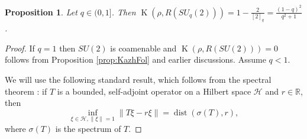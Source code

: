 \documentclass[11 pt, leqno]{amsart}
\newcommand{\eps}{\varepsilon}
\newcommand{\md}{\operatorname{d}\!}
\newcommand{\la}{\langle}
\newcommand{\ra}{\rangle}
\newcommand{\RR}{\mathbb{R}}
\newcommand{\oon}{\operatorname}
\DeclareMathOperator{\Kaz}{K}
\newtheorem{proposition}[theorem]{Proposition}
\theoremstyle{definition}
\numberwithin{equation}{section}
\begin{document}
\begin{proposition} \label{prop11}
Let $q \in (0,1]$. Then $\Kaz(\rho,R(SU_q(2)))= 1 - \frac{2}{[2]_q}  =\tfrac{(1-q)^2}{q^2+1}$.
\end{proposition}
\begin{proof}
If $q=1$ then $SU(2)$ is coamenable and $\Kaz(\rho,R(SU(2)))=0$ follows from Proposition \ref{prop:KazhFol} and earlier discussions. Assume $q<1$.	
	
We will use the following standard result, which follows from the spectral theorem \cite[Section 4.3]{SoltanPrimer}: if $T$ is a bounded, self-adjoint operator on a Hilbert space $\mathcal{H}$ and $r\in \RR$, then
\begin{equation}\label{eq14}
\inf_{\xi\in \mathcal{H}, \|\xi\|=1} \|T\xi-r\xi\|=\oon{dist}(\sigma(T),r),
\end{equation}
where $\sigma(T)$ is the spectrum of $T$. 


\end{proof}
\end{document}
